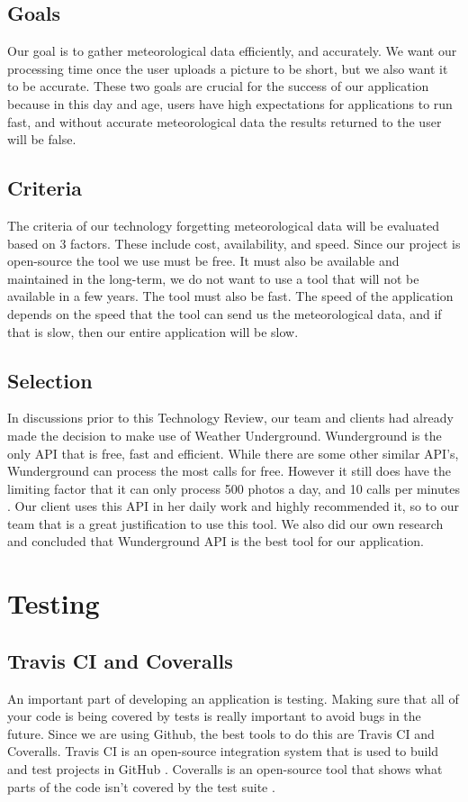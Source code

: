 \documentclass[letterpaper,10pt,draftclsnofoot,onecolumn]{IEEEtran}
\begin{document}
\begin{flushleft}
\subsection{Goals}
Our goal is to gather meteorological data efficiently, and accurately. We want our processing time once the user uploads a picture to be short, but we also want it to be accurate. These two goals are crucial for the success of our application because in this day and age, users have high expectations for applications to run fast, and without accurate meteorological data the results returned to the user will be false.





\subsection{Criteria}
The criteria of our technology forgetting meteorological data will be evaluated based on 3 factors. These include cost, availability, and speed. Since our project is open-source the tool we use must be free. It must also be available and maintained in the long-term, we do not want to use a tool that will not be available in a few years. The tool must also be fast. The speed of the application depends on the speed that the tool can send us the meteorological data, and if that is slow, then our entire application will be slow.


\subsection{Selection}
In discussions prior to this Technology Review, our team and clients had already made the decision to make use of Weather Underground. Wunderground is the only API that is free, fast and efficient. While there are some other similar API’s, Wunderground can process the most calls for free. However it still does have the limiting factor that it can only process 500 photos a day, and 10 calls per minutes \cite{17}. Our client uses this API in her daily work and highly recommended it, so to our team that is a great justification to use this tool. We  also did our own research and concluded that Wunderground API is the best tool for our application.


\section{Testing}

\subsection{Travis CI and Coveralls}
An important part of developing an application is testing. Making sure that all of your code is being covered by tests is really important to avoid bugs in the future. Since we are using Github, the best tools to do this are Travis CI and Coveralls. Travis CI is an open-source integration system that is used to build and test projects in GitHub \cite{18}. Coveralls is an open-source tool that shows what parts of the code isn’t covered by the test suite  \cite{19}.




\end{flushleft}
\end{document}
